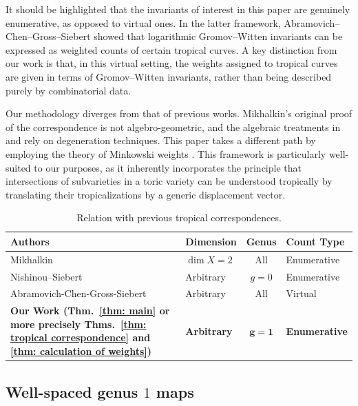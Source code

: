 \documentclass{article}
\begin{document}
It should be highlighted that the invariants of interest in this paper are genuinely enumerative, as opposed to virtual ones. In the latter framework, Abramovich–Chen–Gross–Siebert \cite{ACGSI} showed that logarithmic Gromov–Witten invariants can be expressed as weighted counts of certain tropical curves. A key distinction from our work is that, in this virtual setting, the weights assigned to tropical curves are given in terms of Gromov–Witten invariants, rather than being described purely by combinatorial data.

Our methodology diverges from that of previous works. Mikhalkin’s original proof of the correspondence is not algebro-geometric, and the algebraic treatments in \cite{NS06} and \cite{ACGSI} rely on degeneration techniques. This paper takes a different path by employing the theory of Minkowski weights \cite{FuSt}. This framework is particularly well-suited to our purposes, as it inherently incorporates the principle that intersections of subvarieties in a toric variety can be understood tropically by translating their tropicalizations by a generic displacement vector.


\begin{table}[htpb]
    \centering
    \renewcommand{\arraystretch}{1.3}
    \begin{tabular}{@{}llcl@{}}
        \toprule
        \textbf{Authors} & \textbf{Dimension} & \textbf{Genus} & \textbf{Count Type} \\
        \midrule
        Mikhalkin \cite{Mik05} & $\dim X = 2$ & All & Enumerative \\
        Nishinou--Siebert \cite{NS06} & Arbitrary & $g=0$ & Enumerative \\
        Abramovich-Chen-Gross-Siebert \cite{ACGSI} & Arbitrary & All & Virtual \\
        \midrule
        \textbf{Our Work (Thm.~\ref{thm: main} or more precisely Thms.~\ref{thm: tropical correspondence} and \ref{thm: calculation of weights})} & \textbf{Arbitrary} & $\mathbf{g=1}$ & \textbf{Enumerative} \\
        \bottomrule
    \end{tabular}
    \vspace{0.2cm}
    \caption{Relation with previous tropical correspondences.}
    \label{tab:historical_context}
\end{table}



\subsection{Well-spaced genus $1$ maps}
\end{document}
